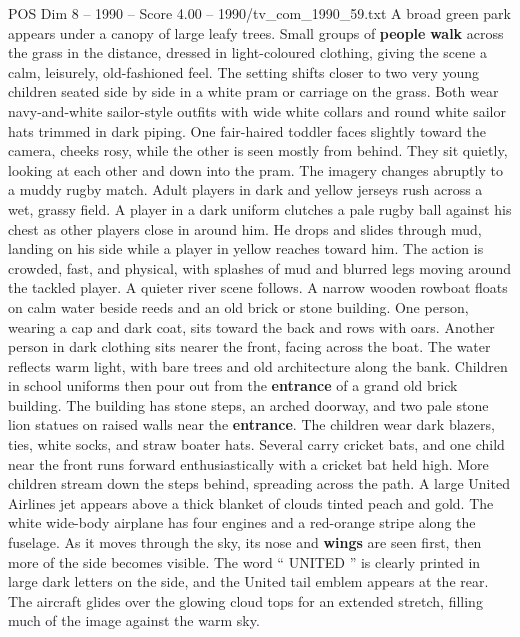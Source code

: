 \begin{textsample}{POS Dim 8 – 1990 – Score 4.00 – 1990/tv\_com\_1990\_59.txt}  \label{ex:f8_pos_068}
A broad green park appears under a canopy of large leafy trees.
Small groups of \textbf{people} \textbf{walk} across the grass in the distance, dressed in light-coloured clothing, giving the scene a calm, leisurely, old-fashioned feel.
The setting shifts closer to two very young children seated side by side in a white pram or carriage on the grass.
Both wear navy-and-white sailor-style outfits with wide white collars and round white sailor hats trimmed in dark piping.
One fair-haired toddler faces slightly toward the camera, cheeks rosy, while the other is seen mostly from behind.
They sit quietly, looking at each other and down into the pram.
The imagery changes abruptly to a muddy rugby match.
Adult players in dark and yellow jerseys rush across a wet, grassy field.
A player in a dark uniform clutches a pale rugby ball against his chest as other players close in around him.
He drops and slides through mud, landing on his side while a player in yellow reaches toward him.
The action is crowded, fast, and physical, with splashes of mud and blurred legs moving around the tackled player.
A quieter river scene follows.
A narrow wooden rowboat floats on calm water beside reeds and an old brick or stone building.
One person, wearing a cap and dark coat, sits toward the back and rows with oars.
Another person in dark clothing sits nearer the front, facing across the boat.
The water reflects warm light, with bare trees and old architecture along the bank.
Children in school uniforms then pour out from the \textbf{entrance} of a grand old brick building.
The building has stone steps, an arched doorway, and two pale stone lion statues on raised walls near the \textbf{entrance}.
The children wear dark blazers, ties, white socks, and straw boater hats.
Several carry cricket bats, and one child near the front runs forward enthusiastically with a cricket bat held high.
More children stream down the steps behind, spreading across the path.
A large United Airlines jet appears above a thick blanket of clouds tinted peach and gold.
The white wide-body airplane has four engines and a red-orange stripe along the fuselage.
As it moves through the sky, its nose and \textbf{wings} are seen first, then more of the side becomes visible.
The word “ UNITED ” is clearly printed in large dark letters on the side, and the United tail emblem appears at the rear.
The aircraft glides over the glowing cloud tops for an extended stretch, filling much of the image against the warm sky.

\end{textsample}
